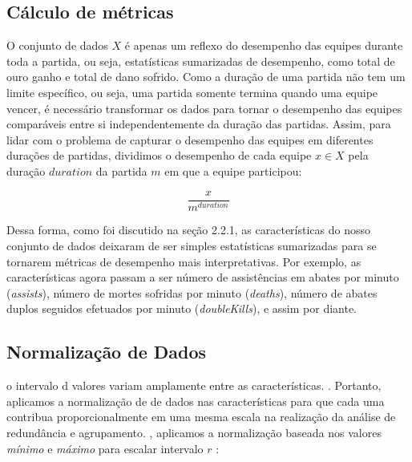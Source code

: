 \subsection{Cálculo de métricas}

O conjunto de dados $X$ é apenas um reflexo do desempenho das equipes durante toda a partida, ou seja, estatísticas sumarizadas de desempenho, como total de ouro ganho e total de dano sofrido. Como a duração de uma partida não tem um limite específico, ou seja, uma partida somente termina quando uma equipe vencer, é necessário transformar os dados para tornar o desempenho das equipes comparáveis entre si independentemente da duração das partidas. Assim, para lidar com o problema de capturar o desempenho das equipes em diferentes durações de partidas, dividimos o desempenho de cada equipe $x \in X$ pela duração $duration$ da partida $m$ em que a equipe participou:

\begin{displaymath}
  \frac{x}{m^{duration}}
\end{displaymath}

Dessa forma, como foi discutido na seção 2.2.1, as características do nosso conjunto de dados deixaram de ser simples estatísticas sumarizadas para se tornarem métricas de desempenho mais interpretativas. Por exemplo, as características agora passam a ser número de assistências em abates por minuto (\textit{assists}), número de mortes sofridas por minuto (\textit{deaths}), número de abates duplos seguidos efetuados por minuto (\textit{doubleKills}), e assim por diante.

\subsection{Normalização de Dados}
 o intervalo d valores variam amplamente entre as características. . Portanto, aplicamos a normalização de de dados  \cite{zaki2014data} nas características  para que cada uma contribua proporcionalmente em uma mesma escala  na realização da análise de redundância e agrupamento. , aplicamos a normalização baseada nos valores \textit{mínimo} e \textit{máximo} para escalar   intervalo $r$ :

